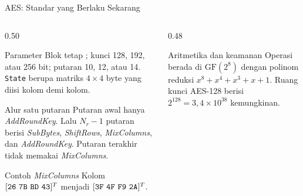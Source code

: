 \documentclass[aspectratio=169,11pt]{beamer}
\begin{document}
\begin{frame}{AES: Standar yang Berlaku Sekarang}
    \begin{columns}[T,onlytextwidth]
        \begin{column}{0.50\textwidth}
            \scriptsize
            \begin{block}{Parameter}
                Blok tetap ; kunci 128, 192, atau 256 bit;
                putaran 10, 12, atau 14. \texttt{State} berupa matriks
                $4 \times 4$ byte yang diisi kolom demi kolom.
            \end{block}
            \begin{block}{Alur satu putaran}
                Putaran awal hanya \textit{AddRoundKey}. Lalu $N_r-1$ putaran
                berisi \textit{SubBytes}, \textit{ShiftRows},
                \textit{MixColumns}, dan \textit{AddRoundKey}. Putaran terakhir
                tidak memakai \textit{MixColumns}.
            \end{block}
            \begin{exampleblock}{Contoh \textit{MixColumns}}
                Kolom $[\code{26}\ \code{7B}\ \code{BD}\ \code{43}]^{T}$
                menjadi $[\code{3F}\ \code{4F}\ \code{F9}\ \code{2A}]^{T}$.
            \end{exampleblock}
        \end{column}
        \begin{column}{0.48\textwidth}
            \centering
            \vspace{0.1cm}
            \begin{alertblock}{Aritmetika dan keamanan}
                \footnotesize
                Operasi berada di $\mathrm{GF}(2^8)$ dengan polinom reduksi
                $x^8+x^4+x^3+x+1$. Ruang kunci AES-128 berisi
                $2^{128}=3{,}4\times10^{38}$ kemungkinan.
            \end{alertblock}
        \end{column}
    \end{columns}
\end{frame}
\end{document}

